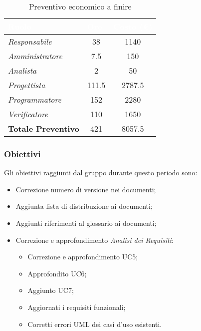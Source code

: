 \begin{table}[H]
    \renewcommand\arraystretch{1.5}
    \centering
    \begin{tabular}{|l|c|c|}
    \hline
    \rowcolor[HTML]{036400}
    \textcolor{white}{\textbf{Ruolo}} & \multicolumn{1}{l|}{\textcolor{white}{\textbf{Ore}}} & \multicolumn{1}{l|}{\textcolor{white}{\textbf{Costo (€)}}} \\ \hline
    \rowcolor[HTML]{EFEFEF}\textit{Responsabile}      & 38              & 1140                 \\ \hline
    \rowcolor[HTML]{C0C0C0}\textit{Amministratore}    & 7.5             & 150                 \\ \hline
    \rowcolor[HTML]{EFEFEF}\textit{Analista}          & 2               & 50                 \\ \hline
    \rowcolor[HTML]{C0C0C0}\textit{Progettista}       & 111.5           & 2787.5                 \\ \hline
    \rowcolor[HTML]{EFEFEF}\textit{Programmatore}     & 152             & 2280                 \\ \hline
    \rowcolor[HTML]{C0C0C0}\textit{Verificatore}      & 110             & 1650                 \\ \hline
    \rowcolor[HTML]{EFEFEF}\textbf{Totale Preventivo} & 421             & 8057.5            \\ \hline
    \end{tabular}
    \caption{Preventivo economico a finire}
\end{table}

\subsubsection{Obiettivi}
Gli obiettivi raggiunti dal gruppo durante questo periodo sono:
\begin{itemize}
    \item Correzione numero di versione nei documenti;
    \item Aggiunta lista di distribuzione ai documenti;
    \item Aggiunti riferimenti al glossario ai documenti;
    \item Correzione e approfondimento \textit{Analisi dei Requisiti}:
    \begin{itemize}
        \item Correzione e approfondimento UC5;
        \item Approfondito UC6;
        \item Aggiunto UC7;
        \item Aggiornati i requisiti funzionali;
        \item Corretti errori UML dei casi d'uso esistenti.
    \end{itemize}
\end{itemize}

